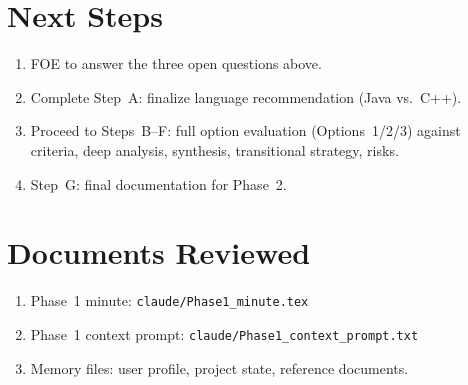 \documentclass[11pt,a4paper]{article}
\begin{document}
\section{Next Steps}

\begin{enumerate}
    \item FOE to answer the three open questions above.
    \item Complete Step~A: finalize language recommendation (Java vs.\ C++).
    \item Proceed to Steps~B--F: full option evaluation (Options~1/2/3) against criteria, deep analysis, synthesis, transitional strategy, risks.
    \item Step~G: final documentation for Phase~2.
\end{enumerate}

\section{Documents Reviewed}

\begin{enumerate}
    \item Phase~1 minute: \texttt{claude/Phase1\_minute.tex}
    \item Phase~1 context prompt: \texttt{claude/Phase1\_context\_prompt.txt}
    \item Memory files: user profile, project state, reference documents.
\end{enumerate}
\end{document}
